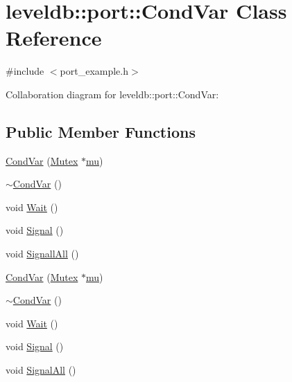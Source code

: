 \hypertarget{classleveldb_1_1port_1_1_cond_var}{\section{leveldb\-:\-:port\-:\-:Cond\-Var Class Reference}
\label{classleveldb_1_1port_1_1_cond_var}
}


{\ttfamily \#include $<$port\-\_\-example.\-h$>$}



Collaboration diagram for leveldb\-:\-:port\-:\-:Cond\-Var\-:
\subsection*{Public Member Functions}
\begin{DoxyCompactItemize}
\item 
\hyperlink{classleveldb_1_1port_1_1_cond_var_abb23c74c7b58298a20d4cfd6a0c5839a}{Cond\-Var} (\hyperlink{classleveldb_1_1port_1_1_mutex}{Mutex} $\ast$\hyperlink{db__impl_8cc_a900dad9ea326bf70a183d88a8ab50a13}{mu})
\item 
\hyperlink{classleveldb_1_1port_1_1_cond_var_abf5e80198afeeccf1ee1b9af848d0cf6}{$\sim$\-Cond\-Var} ()
\item 
void \hyperlink{classleveldb_1_1port_1_1_cond_var_a9e9855595a3f3a3ccf47949696065597}{Wait} ()
\item 
void \hyperlink{classleveldb_1_1port_1_1_cond_var_ac36a2038b058b24886741c99e4a7d7d4}{Signal} ()
\item 
void \hyperlink{classleveldb_1_1port_1_1_cond_var_a516114902b0ac99e541d74f182faa7b4}{Signall\-All} ()
\item 
\hyperlink{classleveldb_1_1port_1_1_cond_var_abb23c74c7b58298a20d4cfd6a0c5839a}{Cond\-Var} (\hyperlink{classleveldb_1_1port_1_1_mutex}{Mutex} $\ast$\hyperlink{db__impl_8cc_a900dad9ea326bf70a183d88a8ab50a13}{mu})
\item 
\hyperlink{classleveldb_1_1port_1_1_cond_var_abf5e80198afeeccf1ee1b9af848d0cf6}{$\sim$\-Cond\-Var} ()
\item 
void \hyperlink{classleveldb_1_1port_1_1_cond_var_a9e9855595a3f3a3ccf47949696065597}{Wait} ()
\item 
void \hyperlink{classleveldb_1_1port_1_1_cond_var_ac36a2038b058b24886741c99e4a7d7d4}{Signal} ()
\item 
void \hyperlink{classleveldb_1_1port_1_1_cond_var_ad7725662f3c1bc542100c41081d1428a}{Signal\-All} ()
\end{DoxyCompactItemize}
